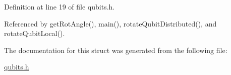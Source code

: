 Definition at line 19 of file qubits.\+h.



Referenced by get\+Rot\+Angle(), main(), rotate\+Qubit\+Distributed(), and rotate\+Qubit\+Local().



The documentation for this struct was generated from the following file\+:\begin{DoxyCompactItemize}
\item 
\hyperlink{qubits_8h}{qubits.\+h}\end{DoxyCompactItemize}
